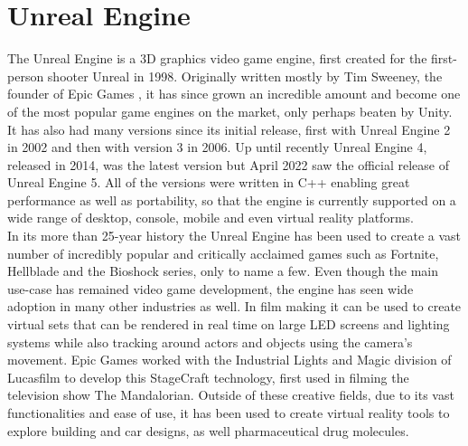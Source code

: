 \chapter{Unreal Engine}\label{chp:UnrealEngine}

The Unreal Engine is a 3D graphics video game engine, first created for the first-person shooter Unreal in 1998\cite{bib:UnrealFacts}. Originally written mostly by Tim Sweeney, the founder of Epic Games \cite{bib:TimSweeney}, it has since grown an incredible amount and become one of the most popular game engines on the market, only perhaps beaten by Unity\cite{bib:UnrealFacts}. It has also had many versions since its initial release, first with Unreal Engine 2 in 2002 and then with version 3 in 2006\cite{bib:UnrealFacts}. Up until recently Unreal Engine 4, released in 2014, was the latest version but April 2022 saw the official release of Unreal Engine 5. All of the versions were written in C++ enabling great performance as well as portability, so that the engine is currently supported on a wide range of desktop, console, mobile and even virtual reality platforms\cite{bib:UnrealFacts}.\\

In its more than 25-year history the Unreal Engine has been used to create a vast number of incredibly popular and critically acclaimed games such as Fortnite, Hellblade and the Bioshock series, only to name a few\cite{bib:UnrealGames}. Even though the main use-case has remained video game development, the engine has seen wide adoption in many other industries as well. In film making it can be used to create virtual sets that can be rendered in real time on large LED screens and lighting systems while also tracking around actors and objects using the camera's movement. Epic Games worked with the Industrial Lights and Magic division of Lucasfilm to develop this StageCraft technology, first used in filming the television show The Mandalorian\cite{bib:Mando}. Outside of these creative fields, due to its vast functionalities and ease of use, it has been used to create virtual reality tools to explore building and car designs, as well pharmaceutical drug molecules\cite{bib:VRFields}.\\

